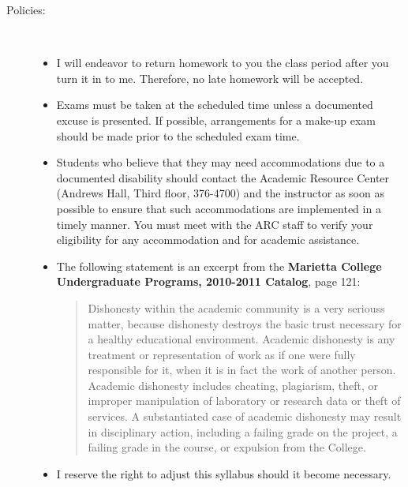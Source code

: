 \documentclass{article}
\begin{document}
\begin{description}
\item[Policies:] {\ } \newline
  \begin{itemize}
  \item I will endeavor to return homework to you the class period
    after you turn it in to me.  Therefore, no late homework will be
    accepted.
  \item Exams must be taken at the scheduled time unless a documented
    excuse is presented.  If possible, arrangements for a make-up exam
    should be made prior to the scheduled exam time.
  \item Students who believe that they may need accommodations due to
    a documented disability should contact the Academic Resource
    Center (Andrews Hall, Third floor, 376-4700) and the instructor as
    soon as possible to ensure that such accommodations are
    implemented in a timely manner. You must meet with the ARC staff
    to verify your eligibility for any accommodation and for academic
    assistance.
  \item The following statement is an excerpt from the {\bf Marietta
    College Undergraduate Programs, 2010-2011 Catalog}, page 121:
  \begin{quotation} Dishonesty within the academic community is a very
    seriouss matter, because dishonesty destroys the basic trust
    necessary for a healthy educational environment. Academic
    dishonesty is any treatment or representation of work as if one
    were fully responsible for it, when it is in fact the work of
    another person.  Academic dishonesty includes cheating,
    plagiarism, theft, or improper manipulation of laboratory or
    research data or theft of services. A substantiated case of
    academic dishonesty may result in disciplinary action, including a
    failing grade on the project, a failing grade in the course, or
    expulsion from the College.\end{quotation}
  \item I reserve the right to adjust this syllabus should it become
    necessary.
\end{itemize}
\end{description}
\newpage
\end{document}
